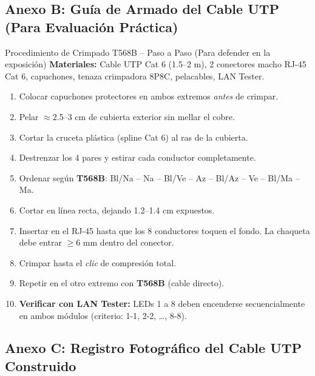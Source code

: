 \documentclass[12pt,a4paper]{article}
\begin{document}
\subsection{Anexo B: Guía de Armado del Cable UTP (Para Evaluación Práctica)}

\begin{cajatecnica}{Procedimiento de Crimpado T568B -- Paso a Paso (Para defender en la exposición)}
  \textbf{Materiales:} Cable UTP Cat 6 (1.5--2 m), 2 conectores macho RJ-45 Cat 6, capuchones, tenaza crimpadora 8P8C, pelacables, LAN Tester.\\[6pt]
  \begin{enumerate}[leftmargin=2.1cm, labelwidth=1.8cm, label=\textbf{Paso \arabic*:}, itemsep=3pt]
    \item Colocar capuchones protectores en ambos extremos \textit{antes} de crimpar.
    \item Pelar $\approx$2.5--3 cm de cubierta exterior sin mellar el cobre.
    \item Cortar la cruceta plástica (spline Cat 6) al ras de la cubierta.
    \item Destrenzar los 4 pares y estirar cada conductor completamente.
    \item Ordenar según \textbf{T568B}: Bl/Na -- Na -- Bl/Ve -- Az -- Bl/Az -- Ve -- Bl/Ma -- Ma.
    \item Cortar en línea recta, dejando 1.2--1.4 cm expuestos.
    \item Insertar en el RJ-45 hasta que los 8 conductores toquen el fondo. La chaqueta debe entrar $\geq$6 mm dentro del conector.
    \item Crimpar hasta el \textit{clic} de compresión total.
    \item Repetir en el otro extremo con \textbf{T568B} (cable directo).
    \item \textbf{Verificar con LAN Tester:} LEDs 1 a 8 deben encenderse secuencialmente en ambos módulos (criterio: 1-1, 2-2, \ldots, 8-8).
  \end{enumerate}
\end{cajatecnica}

\subsection{Anexo C: Registro Fotográfico del Cable UTP Construido}
\end{document}
